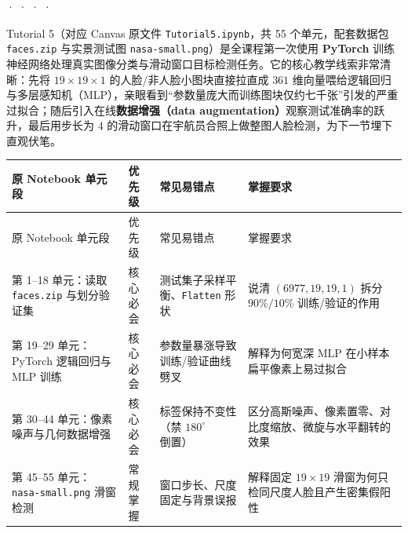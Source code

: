 

 ·  ·  ·  · 



Tutorial 5（对应 Canvas 原文件 \texttt{Tutorial5.ipynb}，共 55 个单元，配套数据包 \texttt{faces.zip} 与实景测试图 \texttt{nasa-small.png}）是全课程第一次使用 \textbf{PyTorch} 训练神经网络处理真实图像分类与滑动窗口目标检测任务。它的核心教学线索非常清晰：先将 $19\times 19\times 1$ 的人脸/非人脸小图块直接拉直成 $361$ 维向量喂给逻辑回归与多层感知机（MLP），亲眼看到“参数量庞大而训练图块仅约七千张”引发的严重过拟合；随后引入在线\textbf{数据增强（data augmentation）}观察测试准确率的跃升，最后用步长为 $4$ 的滑动窗口在宇航员合照上做整图人脸检测，为下一节埋下直观伏笔。

\begingroup\small\setlength{\tabcolsep}{3pt}\renewcommand{\arraystretch}{1.22}
\begin{longtable}{@{}>{\raggedright\arraybackslash}p{}>{\raggedright\arraybackslash}p{}>{\raggedright\arraybackslash}p{}>{\raggedright\arraybackslash}p{}@{}}
\toprule
原 Notebook 单元段 & 优先级 & 常见易错点 & 掌握要求 \\
\midrule\endfirsthead
原 Notebook 单元段 & 优先级 & 常见易错点 & 掌握要求 \\
\midrule\endhead
\bottomrule\endfoot
第 1–18 单元：读取 \texttt{faces.zip} 与划分验证集 & 核心必会 & 测试集子采样平衡、\texttt{Flatten} 形状 & 说清 $(6977,19,19,1)$ 拆分 $90\%/10\%$ 训练/验证的作用 \\
第 19–29 单元：PyTorch 逻辑回归与 MLP 训练 & 核心必会 & 参数量暴涨导致训练/验证曲线劈叉 & 解释为何宽深 MLP 在小样本扁平像素上易过拟合 \\
第 30–44 单元：像素噪声与几何数据增强 & 核心必会 & 标签保持不变性（禁 $180^\circ$ 倒置） & 区分高斯噪声、像素置零、对比度缩放、微旋与水平翻转的效果 \\
第 45–55 单元：\texttt{nasa-small.png} 滑窗检测 & 常规掌握 & 窗口步长、尺度固定与背景误报 & 解释固定 $19\times 19$ 滑窗为何只检同尺度人脸且产生密集假阳性 \\
\end{longtable}\endgroup


